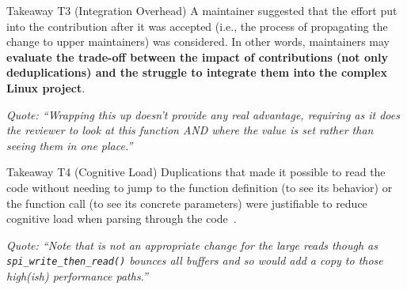 \documentclass[10pt,conference]{IEEEtran}
\newenvironment{highlight-box}[1]{%
  \begin{tcolorbox}
  \textbf{#1:} \itshape}{\end{tcolorbox}}
\begin{document}
\begin{highlight-box}{Takeaway T3 (Integration Overhead)}
  A maintainer suggested that the effort put into the contribution after it was
  accepted (i.e., the process of propagating the change to upper maintainers)
  was considered. In other words, maintainers may \textbf{evaluate the
  trade-off between the impact of contributions (not only deduplications) and
  the struggle to integrate them into the complex Linux project}.
\end{highlight-box}

\noindent
\begin{footnotesize}
\textit{
    Quote: ``Wrapping this up doesn't provide any real advantage, requiring as
    it does the reviewer to look at this function AND where the value is set
    rather than seeing them in one place.''
  }
\end{footnotesize}

%
\begin{highlight-box}{Takeaway T4 (Cognitive Load)}
  Duplications that made it possible to read the code without needing to jump
  to the function definition (to see its behavior) or the function call (to see
  its concrete parameters) were justifiable to reduce cognitive load when
  parsing through the code~\cite{skylines-cognitive-load}.
\end{highlight-box}

\noindent
\begin{footnotesize}
\textit{
    Quote: ``Note that is not an appropriate change for the large reads though
    as \texttt{spi\_write\_then\_read()} bounces all buffers and so would add a
    copy to those high(ish) performance paths.''
  }
\end{footnotesize}
\end{document}
